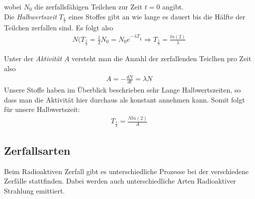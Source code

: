\documentclass[12pt]{article}
\begin{document}
wobei $N_0$ die zerfallsfähigen Teilchen zur Zeit $t=0$ angibt.\\
Die \textit{Halbwertszeit} $T_{\frac{1}{2}}$ eines Stoffes gibt an wie lange es dauert bis die Hälfte der Teilchen zerfallen sind. Es folgt also
\begin{align}
N(T_{\frac{1}{2}} = \frac{1}{2} N_0 = N_0 e^{ -\lambda T_{\frac{1}{2}}} \Rightarrow T_{\frac{1}{2}} = \frac{ln(2)}{\lambda}
\end{align}

Unter der \textit{Aktivität} $A$ versteht man die Anzahl der zerfallenden Teiclhen pro Zeit also 
\begin{align}
 \label{Aktivität} A = -\frac{dN}{dt} = \lambda N
\end{align}
Unsere Stoffe haben im Überblick beschrieben sehr Lange Halbwertszeiten, so dass man die Aktivität hier durchaus als konstant annehmen kann. Somit folgt für unsere Halbwertszeit:
\begin{align}
 \label{Halbzeit} T_{\frac{1}{2}} = \frac{N ln(2)}{A}
\end{align}

\subsection{Zerfallsarten}

Beim Radioaktiven Zerfall gibt es unterschiedliche Prozesse bei der verschiedene Zerfälle stattfinden. Dabei werden auch unterschiedliche Arten Radioaktiver Strahlung emittiert.
\end{document}
